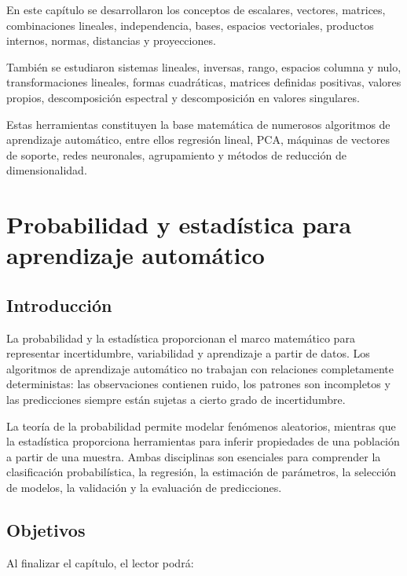 \documentclass[
  spanish,
  11pt,
  letterpaper,
  DIV=11,
  numbers=noendperiod]{scrreprt}
\theoremstyle{definition}
\theoremstyle{plain}
\theoremstyle{definition}
\theoremstyle{remark}
\begin{document}
En este capítulo se desarrollaron los conceptos de escalares, vectores,
matrices, combinaciones lineales, independencia, bases, espacios
vectoriales, productos internos, normas, distancias y proyecciones.

También se estudiaron sistemas lineales, inversas, rango, espacios
columna y nulo, transformaciones lineales, formas cuadráticas, matrices
definidas positivas, valores propios, descomposición espectral y
descomposición en valores singulares.

Estas herramientas constituyen la base matemática de numerosos
algoritmos de aprendizaje automático, entre ellos regresión lineal, PCA,
máquinas de vectores de soporte, redes neuronales, agrupamiento y
métodos de reducción de dimensionalidad.

\chapter{Probabilidad y estadística para aprendizaje
automático}\label{sec-probabilidad-estadistica}

\section{Introducción}\label{introducciuxf3n-3}

La probabilidad y la estadística proporcionan el marco matemático para
representar incertidumbre, variabilidad y aprendizaje a partir de datos.
Los algoritmos de aprendizaje automático no trabajan con relaciones
completamente deterministas: las observaciones contienen ruido, los
patrones son incompletos y las predicciones siempre están sujetas a
cierto grado de incertidumbre.

La teoría de la probabilidad permite modelar fenómenos aleatorios,
mientras que la estadística proporciona herramientas para inferir
propiedades de una población a partir de una muestra. Ambas disciplinas
son esenciales para comprender la clasificación probabilística, la
regresión, la estimación de parámetros, la selección de modelos, la
validación y la evaluación de predicciones.

\section{Objetivos}\label{objetivos-2}

Al finalizar el capítulo, el lector podrá:
\end{document}

